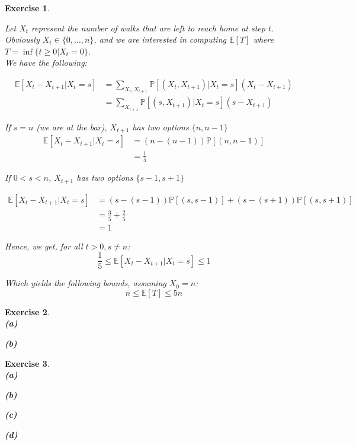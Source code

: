 \documentclass{article}
\newtheorem{exo}{Exercise}
\def\P{\mathbb{P}}
\def\E{\mathbb{E}}
\begin{document}
\begin{exo}{\ \\}

Let $X_t$ represent the number of walks that are left to reach home at step $t$. Obviously $X_t \in \{0, \dots, n\}$, and we are interested in computing $\E[T]$ where $T = \inf\{t \geq 0 | X_t = 0 \}$. \\

We have the following:

\begin{align*}
    \E[X_t - X_{t+1}| X_t=s]  
    &= \sum_{X_t, X_{t+1}} \P[(X_t, X_{t+1})|X_t=s](X_t-X_{t+1}) \\
    &= \sum_{X_{t+1}} \P[(s,X_{t+1})|X_t=s](s-X_{t+1})
\end{align*}

If $s=n$ (we are at the bar), $X_{t+1}$ has two options $\{n, n-1\}$
\begin{align*}
    \E[X_t-X_{t+1} | X_t = s] &= (n - (n-1))\P[(n, n-1)] \\
                               &= \frac{1}{5}
\end{align*}


If $0<s<n$, $X_{t+1}$ has two options $\{s-1, s+1\}$

\begin{align*}
    \E[X_t-X_{t+1} | X_t = s] 
    &= (s - (s-1))\P[(s, s-1)] + (s-(s+1))\P[(s, s+1)] \\
    &= \frac{3}{5} + \frac{2}{5} \\
    &= 1
\end{align*}

Hence, we get, for all $t>0, s \neq n$:
\[ \frac{1}{5} \leq \E[X_t-X_{t+1} | X_t = s]  \leq 1 \]

Which yields the following bounds, assuming $X_0 = n$:
\[ n \leq \E[T] \leq 5n \]
\end{exo}

\begin{exo}{\ \\}
\noindent
\textbf{(a)}

\noindent
\textbf{(b)} 

\end{exo}


\begin{exo}{\ \\}
\noindent
\textbf{(a)}

\noindent
\textbf{(b)} 

\noindent
\textbf{(c)}  

\noindent
\textbf{(d)} 
\end{exo}
\end{document}
